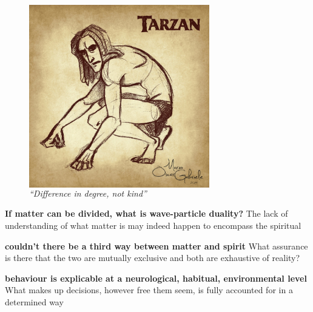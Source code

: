 \documentclass[xcolor=dvipsnames]{beamer}
\begin{document}
\begin{frame}[plain]
\begin{figure}
  \centering
  \begin{columns}
    \centering
    \includegraphics[width=0.7\textwidth]{tarzan}
    \caption {\emph{``Difference in degree, not kind''}}
  \end{columns}
\end{figure}
\end{frame}


\begin{frame}[plain]
\textbf{If matter can be divided, what is wave-particle duality?}\newline
The lack of understanding of what matter is may indeed happen to encompass the spiritual \vspace{10mm}

\textbf{couldn't there be a third way between matter and spirit}\newline
What assurance is there that the two are mutually exclusive and both are exhaustive of reality? \vspace{10mm}

\textbf{behaviour is explicable at a neurological, habitual, environmental level}\newline
What makes up decisions, however free them seem, is fully accounted for in a determined way \vspace{10mm}
\end{frame}
\end{document}

